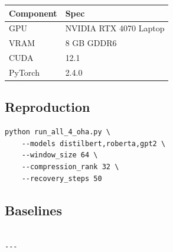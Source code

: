 \begin{table}[H]
\centering
\small
\begin{tabular}{ll}
\toprule
\textbf{Component} & \textbf{Spec} \\
\midrule
GPU & NVIDIA RTX 4070 Laptop \\
VRAM & 8 GB GDDR6 \\
CUDA & 12.1 \\
PyTorch & 2.4.0 \\
\bottomrule
\end{tabular}
\end{table}

\subsection{Reproduction}

\begin{lstlisting}
python run_all_4_oha.py \
    --models distilbert,roberta,gpt2 \
    --window_size 64 \
    --compression_rank 32 \
    --recovery_steps 50
\end{lstlisting}

\subsection{Baselines}

\begin{lstlisting}

---
\end{lstlisting}